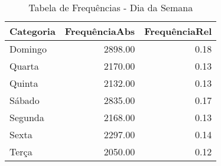 \begin{table}[ht]
\centering
\begin{tabular}{lrr}
  \hline
Categoria & FrequênciaAbs & FrequênciaRel \\ 
  \hline
Domingo & 2898.00 & 0.18 \\ 
  Quarta & 2170.00 & 0.13 \\ 
  Quinta & 2132.00 & 0.13 \\ 
  Sábado & 2835.00 & 0.17 \\ 
  Segunda & 2168.00 & 0.13 \\ 
  Sexta & 2297.00 & 0.14 \\ 
  Terça & 2050.00 & 0.12 \\ 
   \hline
\end{tabular}
\caption{Tabela de Frequências - Dia da Semana} 
\end{table}
